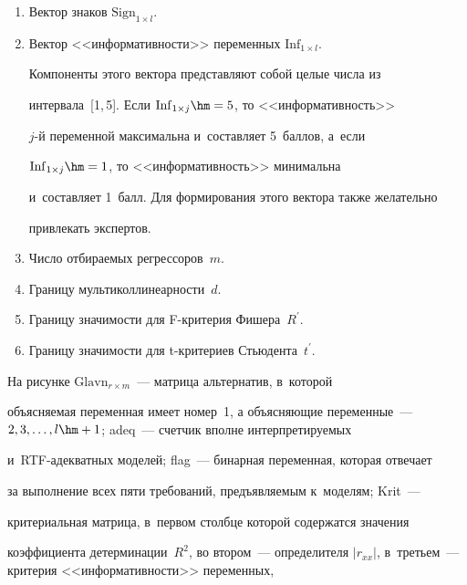   \begin{enumerate}[1.]


\item Вектор знаков $\mathrm{Sign}_{1\times l}$.


\item Вектор <<информативности>> переменных $\mathrm{Inf}_{1\times l}$. 


Компоненты этого вектора представляют собой целые числа из 


интервала~[1,\,5]. Если $\mathrm{Inf}_{1\times j}\hm=5$, то <<информативность>> 


\mbox{$j$-й} переменной максимальна и~составляет 5~баллов, а~если 


$\mathrm{Inf}_{1\times j}\hm=1$, то <<информативность>> минимальна 


и~составляет 1~балл. Для формирования этого вектора также желательно 


привлекать экспертов.


\item Число отбираемых регрессоров~$m$.


\item Границу мультиколлинеарности~$d$.


\item Границу значимости для F-кри\-те\-рия Фишера~$R^\prime$.


\item Границу значимости для t-кри\-те\-ри\-ев Стьюдента~$t^\prime$.


\end{enumerate}


  


  На рисунке $\mathrm{Glavn}_{r\times m}$~--- матрица альтернатив, в~которой 


объясняемая переменная имеет номер~1, а объясняющие переменные~--- $2, 3, 


\ldots , l\hm+1$; adeq~--- счетчик вполне интерпретируемых  


и~RTF-адекват\-ных моделей; flag~--- бинарная переменная, которая отвечает 


за выполнение всех пяти требований, предъявляемым к~моделям; Krit~--- 


критериальная матрица, в~первом столбце которой содержатся значения 


коэффициента детерминации~$R^2$, во втором~--- определителя $\vert 


r_{xx}\vert$, в~третьем~--- критерия <<информативности>> переменных, 


